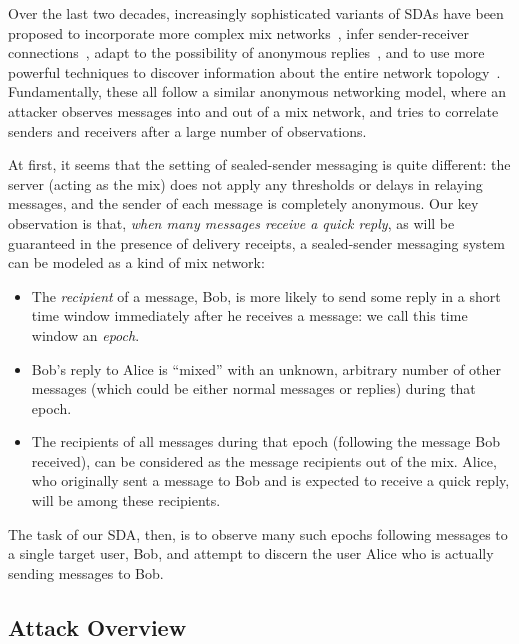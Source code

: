 Over the last two decades, increasingly sophisticated variants of SDAs
have been proposed to incorporate more complex mix networks~\cite{SDA-MD05}, 
infer sender-receiver connections~\cite{reverse-SDA},
adapt to the possibility of anonymous replies~\cite{two-sided-SDA}, and
to use more powerful techniques to discover information about the entire
network topology~\cite{vida-SDA,LSDA}.
Fundamentally, these all follow a similar anonymous networking model,
where an attacker observes messages into and out of a mix network, and
tries to correlate senders and receivers after a large number of
observations.

At first, it seems that the setting of sealed-sender messaging is quite
different: the server (acting as the mix) does not apply any thresholds
or delays in relaying messages, and the sender of each message is
completely anonymous. Our key observation is that, \emph{when many
messages receive a quick reply}, as will be guaranteed in the presence
of delivery receipts, a sealed-sender messaging system can be
modeled as a kind of mix network:
\begin{itemize}
  \item The \emph{recipient} of a message, Bob, is more likely to send
    some reply in a short time window immediately after he receives a
    message: we call this time window an \emph{epoch}.
  \item Bob's reply to Alice is ``mixed'' with an unknown, arbitrary number of other
    messages (which could be either normal messages or replies) during
    that epoch.
  \item The recipients of all messages during that epoch (following the
    message Bob received), can be considered as the message recipients
    out of the mix. Alice, who originally sent a message to Bob and is
    expected to receive a quick reply, will be among these recipients.
\end{itemize}

The task of our SDA, then, is to observe many such epochs following
messages to a single target user, Bob, and attempt to discern the user
Alice who is actually sending messages to Bob.

\subsection{Attack Overview} %
\label{ssec:signal-attackoverview}

